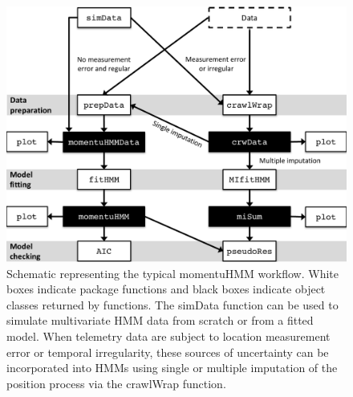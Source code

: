 \documentclass[12pt]{article}\usepackage[]{graphicx}\usepackage[]{color}
\begin{document}
\begin{figure}[htbp]
  \centering
  \includegraphics[width=\textwidth]{workflow_simData.pdf}
  \caption{Schematic representing the typical momentuHMM workflow. White boxes indicate package functions and black boxes indicate object classes returned by functions. The simData function can be used to simulate multivariate HMM data from scratch or from a fitted model. When telemetry data are subject to location measurement error or temporal irregularity, these sources of uncertainty can be incorporated into HMMs using single or multiple imputation of the position process via the crawlWrap function.}
  \label{fig:workflow}
\end{figure}
\end{document}
